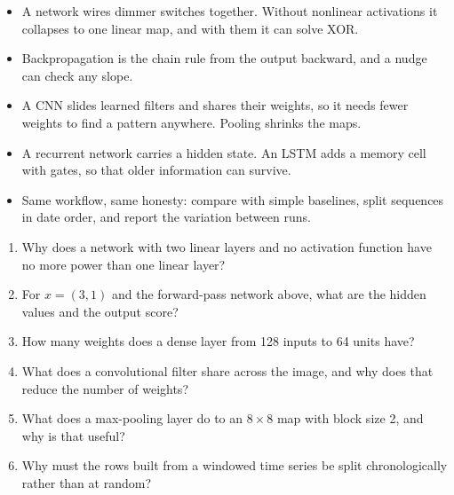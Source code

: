 \begin{chapterrecap}
\begin{itemize}
  \item A network wires dimmer switches together. Without nonlinear activations it collapses to one linear map, and with them it can solve XOR.
  \item Backpropagation is the chain rule from the output backward, and a nudge can check any slope.
  \item A CNN slides learned filters and shares their weights, so it needs fewer weights to find a pattern anywhere. Pooling shrinks the maps.
  \item A recurrent network carries a hidden state. An LSTM adds a memory cell with gates, so that older information can survive.
  \item Same workflow, same honesty: compare with simple baselines, split sequences in date order, and report the variation between runs.
\end{itemize}
\end{chapterrecap}

\begin{quickcheck}
\begin{enumerate}
  \item Why does a network with two linear layers and no activation function have no more power than one linear layer?
  \item For $x=(3,1)$ and the forward-pass network above, what are the hidden values and the output score?
  \item How many weights does a dense layer from 128 inputs to 64 units have?
  \item What does a convolutional filter share across the image, and why does that reduce the number of weights?
  \item What does a max-pooling layer do to an $8\times8$ map with block size 2, and why is that useful?
  \item Why must the rows built from a windowed time series be split chronologically rather than at random?
\end{enumerate}
\end{quickcheck}
